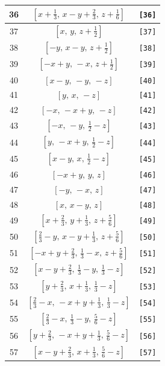 \documentclass[fleqn,8pt]{jsarticle}
\begin{document}
\begin{longtable}{ccc}
36 & $\left[ x + \frac{1}{3},\, x - y + \frac{2}{3},\, z + \frac{1}{6} \right]$ & {\tt [36]} \\ \hline
37 & $\left[ x,\, y,\, z + \frac{1}{2} \right]$ & {\tt [37]} \\ \hline
38 & $\left[ - y,\, x - y,\, z + \frac{1}{2} \right]$ & {\tt [38]} \\ \hline
39 & $\left[ - x + y,\, - x,\, z + \frac{1}{2} \right]$ & {\tt [39]} \\ \hline
40 & $\left[ x - y,\, - y,\, - z \right]$ & {\tt [40]} \\ \hline
41 & $\left[ y,\, x,\, - z \right]$ & {\tt [41]} \\ \hline
42 & $\left[ - x,\, - x + y,\, - z \right]$ & {\tt [42]} \\ \hline
43 & $\left[ - x,\, - y,\, \frac{1}{2} - z \right]$ & {\tt [43]} \\ \hline
44 & $\left[ y,\, - x + y,\, \frac{1}{2} - z \right]$ & {\tt [44]} \\ \hline
45 & $\left[ x - y,\, x,\, \frac{1}{2} - z \right]$ & {\tt [45]} \\ \hline
46 & $\left[ - x + y,\, y,\, z \right]$ & {\tt [46]} \\ \hline
47 & $\left[ - y,\, - x,\, z \right]$ & {\tt [47]} \\ \hline
48 & $\left[ x,\, x - y,\, z \right]$ & {\tt [48]} \\ \hline
49 & $\left[ x + \frac{2}{3},\, y + \frac{1}{3},\, z + \frac{5}{6} \right]$ & {\tt [49]} \\ \hline
50 & $\left[ \frac{2}{3} - y,\, x - y + \frac{1}{3},\, z + \frac{5}{6} \right]$ & {\tt [50]} \\ \hline
51 & $\left[ - x + y + \frac{2}{3},\, \frac{1}{3} - x,\, z + \frac{5}{6} \right]$ & {\tt [51]} \\ \hline
52 & $\left[ x - y + \frac{2}{3},\, \frac{1}{3} - y,\, \frac{1}{3} - z \right]$ & {\tt [52]} \\ \hline
53 & $\left[ y + \frac{2}{3},\, x + \frac{1}{3},\, \frac{1}{3} - z \right]$ & {\tt [53]} \\ \hline
54 & $\left[ \frac{2}{3} - x,\, - x + y + \frac{1}{3},\, \frac{1}{3} - z \right]$ & {\tt [54]} \\ \hline
55 & $\left[ \frac{2}{3} - x,\, \frac{1}{3} - y,\, \frac{5}{6} - z \right]$ & {\tt [55]} \\ \hline
56 & $\left[ y + \frac{2}{3},\, - x + y + \frac{1}{3},\, \frac{5}{6} - z \right]$ & {\tt [56]} \\ \hline
57 & $\left[ x - y + \frac{2}{3},\, x + \frac{1}{3},\, \frac{5}{6} - z \right]$ & {\tt [57]} \\ \hline

\end{longtable}
\end{document}
